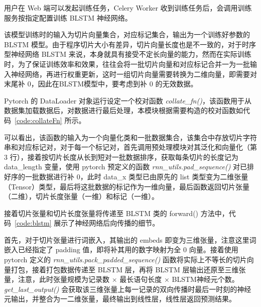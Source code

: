 用户在 Web 端可以发起训练任务，Celery Worker 收到训练任务后，会调用训练服务按指定配置训练 BLSTM 神经网络。

该模型训练时的输入为切片向量集合，对应标记集合，输出为一个训练好参数的 BLSTM 模型。由于程序切片大小有差异，切片向量长度也是不一致的，对于时序型神经网络 BLSTM 来说，本身就具有接受不定长向量的能力，然而在实际训练时，为了保证训练效率和效果，往往会将一批切片向量和对应标记合并一为一批输入神经网络，再进行权重更新，这时一组切片向量需要转换为二维向量，即需要对末尾补 0，因此在BLSTM模型中，要考虑到补 0 的无效数据。

Pytorch 的 DataLoader 对象运行设定一个校对函数 \textit{collate\_fn()}，该函数用于从数据集加载数据后，对数据进行最后处理，本模块根据需要构造的校对函数如代码~\ref{code:collateFn} 所示。

\begin{minipage}[!htbp]{0.9\textwidth}
    
\end{minipage}

可以看出，该函数的输入为一个向量化类和一批数据集合，该集合中存放切片字符串和对应标记对，对于每一个标记对，首先调用预处理模块对其泛化和向量化（第 3 行），接着按切片长度从长到短对一批数据排序，获取每条切片的长度记为 data\_length 变量，使用 pytorch 预定义的函数 \textit{rnn\_utils.pad\_sequence()} 对已排好序的一批数据进行补 0，此时 data\_x 类型已由原先的 list 类型变为二维张量（Tensor）类型，最后将这批数据的标记作为一维向量，最后函数返回切片张量（二维），切片长度张量（一维）和标记（一维）。

接着切片张量和切片长度张量将传递至 BLSTM 类的 forward() 方法中，代码~\ref{code:blstm} 展示了神经网络后向传播的细节。

\begin{minipage}[!htbp]{0.9\textwidth}
    
\end{minipage}

首先，对于切片张量进行词嵌入，其输出的 embeds 即变为三维张量，注意这里词嵌入已经指定了 padding 值，即将补其用的数字映射为全 0 向量。接着使用 pytorch 定义的 \textit{rnn\_utils.pack\_padded\_sequence()} 函数将实际上不等长的切片向量打包，接着打包数据传递至 BLSTM 层，再将 BLSTM 层输出还原至三维张量，注意，此时张量规模为记录数 $\times$ 最长语句长度 $\times$ BLSTM神经元个数。 \textit{get\_last\_output()} 会获取该三维张量上每一记录的双向传播时最后一时刻的神经元输出，并整合为一二维张量，最终输出到线性层，线性层返回预测结果。


